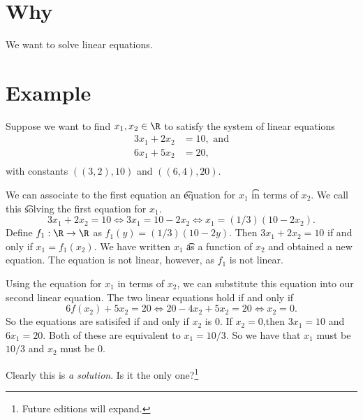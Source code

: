 
\section*{Why}

We want to solve linear equations.

\section*{Example}

Suppose we want to find $x_1, x_2 \in \R $ to satisfy the system of linear equations
\[
\begin{aligned}
3x_1 + 2x_2 &= 10, \text{ and} \\
6x_1 + 5x_2 &= 20, \\
\end{aligned}
\]
with constants $((3, 2), 10)$ and $((6, 4), 20)$.

We can associate to the first equation an \t{equation for} $x_1$ \t{in terms of} $x_2$.
We call this \t{solving the first equation for $x_1$}.
\[
3x_1 + 2x_2 = 10 \iff 3x_1 = 10 - 2x_2 \iff x_1 = (1/3)(10 - 2x_2).
\]
Define $f_1: \R  \to \R $ as $f_1(y) = (1/3)(10 - 2y)$.
Then $3x_1 + 2x_2 = 10$ if and only if $x_1 = f_1(x_2)$.
We have written $x_1$ \t{as a function} of $x_2$ and obtained a new equation.
The equation is not linear, however, as $f_1$ is not linear.

Using the equation for $x_1$ in terms of $x_2$, we can substitute this equation into our second linear equation.
The two linear equations hold if and only if
\[
6f(x_2) + 5x_2 = 20 \iff 20 - 4x_2 + 5x_2 = 20 \iff x_2 = 0.
\]
So the equations are satisifed if and only if $x_2$ is $0$.
If $x_2 = 0$,then $3x_1 = 10$ and $6x_1 = 20$.
Both of these are equivalent to $x_1 = 10/3$.
So we have that $x_1$ must be $10/3$ and $x_2$ must be 0.

Clearly this is \textit{a solution}.
Is it the only one?\footnote{Future editions will expand.}

\blankpage